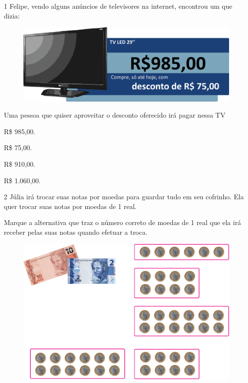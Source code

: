 

\pagebreak
{}

\num{1} Felipe, vendo alguns anúncios de televisores na internet, encontrou um que dizia:

\begin{figure}[htpb!]
\centering
\includegraphics[width=\textwidth]{./media/image73.png}
\end{figure}

Uma pessoa que quiser aproveitar o desconto oferecido irá pagar nessa TV

\begin{escolha}
\item
  R\$ 985,00.
\item
  R\$ 75,00.
\item
  R\$ 910,00.
\item
  R\$ 1.060,00.
\end{escolha}

\num{2} Júlia irá trocar suas notas por moedas para guardar tudo em seu
cofrinho. Ela quer trocar suas notas por moedas de 1 real.

\pagebreak

Marque a
alternativa que traz o número correto de moedas de 1 real que ela
irá receber pelas suas notas quando efetuar a troca.

\begin{figure}[htpb!]
\centering
\includegraphics[width=.65\textwidth]{./media/image74.png}
\end{figure}



